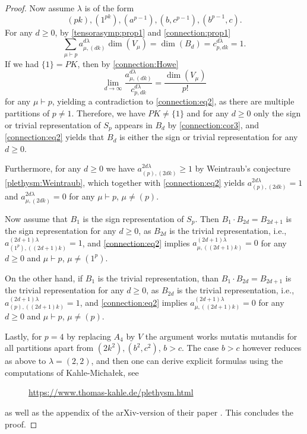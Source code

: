 \documentclass[a4paper]{amsart}
\begin{document}
\begin{proof}
	Now assume $\lambda$ is of the form
	\begin{displaymath}
			(pk),(1^{pk}),(a^{p-1}),(b,c^{p-1}),(b^{p-1},c).
	\end{displaymath}
	For any $d\geq 0$, by \cref{tensorasymp:prop1} and \cref{connection:prop1}
	\begin{equation}\label{connection:eq2}
		\sum\limits_{\mu\vdash p}a_{\mu,(dk)}^{d\lambda}\dim(V_\mu)=
		\dim(B_{d})=c_{p,dk}^{d\lambda}=1.
	\end{equation}
	If we had $\{1\}=PK$,
	then by \cref{connection:Howe}
	\begin{displaymath}
		\lim\limits_{d\to\infty}\frac{a_{\mu,(dk)}^{d\lambda}}{c_{p,dk}^{d\lambda}}=\frac{\dim(V_\mu)}{p!}
	\end{displaymath}
	for any $\mu\vdash p$, yielding a contradiction to \cref{connection:eq2}, as there are multiple partitions of $p\neq 1$.
	Therefore, we have $PK\neq\{1\}$ and for any $d\geq 0$ only the sign or trivial representation of $S_p$ appears in $B_d$ by \cref{connection:cor3},
	and \cref{connection:eq2} yields that $B_d$ is either the sign or trivial representation for any $d\geq 0$.
	
	Furthermore,
	for any $d\geq0$ we have $a_{(p),(2dk)}^{2d\lambda}\geq 1$ by Weintraub's conjecture \cref{plethysm:Weintraub},
	which together with \cref{connection:eq2} yields $a_{(p),(2dk)}^{2d\lambda}=1$ and $a_{\mu,(2dk)}^{2d\lambda}=0$ for any $\mu\vdash p$, $\mu\neq (p)$.
	
	Now assume that $B_1$ is the sign representation of $S_p$.
	Then $B_1\cdot B_{2d}=B_{2d+1}$ is the sign representation for any $d\geq 0$, as $B_{2d}$ is the trivial representation, i.e., $a_{(1^p),((2d+1)k)}^{(2d+1)\lambda}=1$,
	and \cref{connection:eq2} implies $a_{\mu,((2d+1)k)}^{(2d+1)\lambda}=0$ for any $d\geq 0$ and $\mu\vdash p$, $\mu\neq (1^p)$.
	
	On the other hand, if $B_1$ is the trivial representation, than $B_1\cdot B_{2d}=B_{2d+1}$ is the trivial representation for any $d\geq 0$, as $B_{2d}$ is the trivial representation, i.e., $a_{(p),((2d+1)k)}^{(2d+1)\lambda}=1$,
	and \cref{connection:eq2} implies $a_{\mu,((2d+1)k)}^{(2d+1)\lambda}=0$ for any $d\geq 0$ and $\mu\vdash p$, $\mu\neq (p)$.
	
	Lastly, for $p=4$ by replacing $A_4$ by $V$ the argument works mutatis mutandis for all partitions apart from $(2k^2),(b^2,c^2)$, $b>c$.
	The case $b>c$ however reduces as above to $\lambda=(2,2)$, and then one can derive explicit formulas using the computations of Kahle-Micha\l ek, see \
	\begin{figure}[H]
	\centering
	\href{https://www.thomas-kahle.de/plethysm.html}{https://www.thomas-kahle.de/plethysm.html}
	\end{figure}
	as well as the appendix of the arXiv-version of their paper \cite{KM15}.	
	This concludes the proof.
\end{proof}
\end{document}
